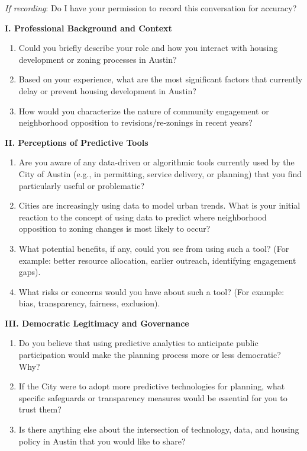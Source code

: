 \documentclass[12pt]{article}
\begin{document}
\textit{If recording}: Do I have your permission to record this conversation for accuracy?

\textbf{I. Professional Background and Context}
\begin{enumerate}[leftmargin=2em]
    \item Could you briefly describe your role and how you interact with housing development or zoning processes in Austin?
    \item Based on your experience, what are the most significant factors that currently delay or prevent housing development in Austin?
    \item How would you characterize the nature of community engagement or neighborhood opposition to revisions/re-zonings in recent years?
\end{enumerate}

\textbf{II. Perceptions of Predictive Tools}
\begin{enumerate}
    \item Are you aware of any data-driven or algorithmic tools currently used by the City of Austin (e.g., in permitting, service delivery, or planning) that you find particularly useful or problematic?
    \item Cities are increasingly using data to model urban trends. What is your initial reaction to the concept of using data to predict where neighborhood opposition to zoning changes is most likely to occur?
    \item What potential benefits, if any, could you see from using such a tool? (For example: better resource allocation, earlier outreach, identifying engagement gaps).
    \item What risks or concerns would you have about such a tool? (For example: bias, transparency, fairness, exclusion).
\end{enumerate}

\textbf{III. Democratic Legitimacy and Governance}
\begin{enumerate}
    \item Do you believe that using predictive analytics to anticipate public participation would make the planning process more or less democratic? Why?
    \item If the City were to adopt more predictive technologies for planning, what specific safeguards or transparency measures would be essential for you to trust them?
    \item Is there anything else about the intersection of technology, data, and housing policy in Austin that you would like to share?
\end{enumerate}
\end{document}
